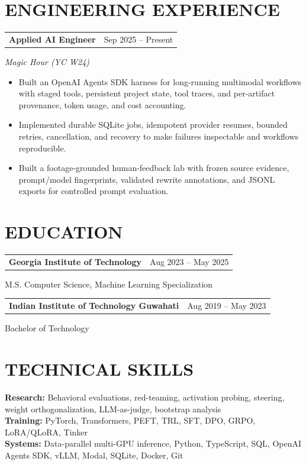 \documentclass[10pt,letterpaper]{article}
\makeatletter
\newcommand{\entry}[3]{%
  \begin{tabularx}{\linewidth}{@{}X r@{}}\textbf{#1} & {\small #3}\end{tabularx}\par
  {\small\textit{#2}}\par\vspace{1pt}}
\newcommand{\school}[3]{%
  \begin{tabularx}{\linewidth}{@{}X r@{}}\textbf{#1} & {\small #3}\end{tabularx}\par
  {\small #2}\par\vspace{3pt}}
\makeatother
\begin{document}
\section*{ENGINEERING EXPERIENCE}
\entry{Applied AI Engineer}{Magic Hour (YC W24)}{Sep 2025 -- Present}
\begin{itemize}
  \item Built an OpenAI Agents SDK harness for long-running multimodal workflows with staged tools, persistent project state, tool traces, and per-artifact provenance, token usage, and cost accounting.
  \item Implemented durable SQLite jobs, idempotent provider resumes, bounded retries, cancellation, and recovery to make failures inspectable and workflows reproducible.
  \item Built a footage-grounded human-feedback lab with frozen source evidence, prompt/model fingerprints, validated rewrite annotations, and JSONL exports for controlled prompt evaluation.
\end{itemize}

\section*{EDUCATION}
\school{Georgia Institute of Technology}{M.S. Computer Science, Machine Learning Specialization}{Aug 2023 -- May 2025}
\school{Indian Institute of Technology Guwahati}{Bachelor of Technology}{Aug 2019 -- May 2023}

\section*{TECHNICAL SKILLS}
{\small
\textbf{Research:} Behavioral evaluations, red-teaming, activation probing, steering, weight orthogonalization, LLM-as-judge, bootstrap analysis\\[2pt]
\textbf{Training:} PyTorch, Transformers, PEFT, TRL, SFT, DPO, GRPO, LoRA/QLoRA, Tinker\\[2pt]
\textbf{Systems:} Data-parallel multi-GPU inference, Python, TypeScript, SQL, OpenAI Agents SDK, vLLM, Modal, SQLite, Docker, Git
}
\end{document}
